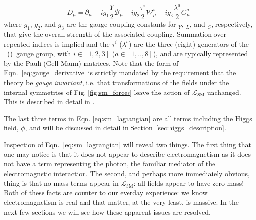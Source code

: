 \begin{equation}
	\mathit{D}_{\mu} = \partial_{\mu} - i g_1 \frac{Y}{2} \mathcal{B}_{\mu} - i g_2 \frac{\tau^i}{2} \mathcal{W}_{\mu}^i - i g_3 \frac{\lambda^a}{2} G_{\mu}^a
	\label{eq:gauge_derivative}
\end{equation}
where $g_1$, $g_2$, and $g_3$ are the gauge coupling constants for \Uone$_{Y}$, \SUtwo$_{L}$, and \SUthree$_{C}$, respectively, that give the overall strength of the associated coupling.
Summation over repeated indices is implied and the $\tau^i$ ($\lambda^a$) are the three (eight)
generators of the \SUtwo~(\SUthree)~gauge group, with $i \in [1,2,3]$ ($a \in [1,..,8]$), and
are typically represented by the Pauli (Gell-Mann) matrices. Note that the form of Eqn.~\ref{eq:gauge_derivative} is strictly mandated by the requirement that the theory
be \textit{gauge invariant}, i.e. that transformations of the fields under the internal symmetries
of Fig. \ref{fig:sm_forces} leave the action of $\mathcal{L}_{\text{SM}}$ unchanged. This is described in detail
in {\color{red}{Appendix XXX}}.

The last three terms in Eqn. \ref{eq:sm_lagrangian} are all terms including the Higgs field, $\phi$,
and will be discussed in detail in Section~\ref{sec:higgs_description}.

Inspection of Eqn.~\ref{eq:sm_lagrangian} will reveal two things. The first thing that one
may notice is that it does not appear to describe electromagnetism as it does not have a
term representing the photon, the familiar mediator of the electromagnetic interaction.
The second, and perhaps more immediately obvious, thing is that no mass terms
appear in $\mathcal{L}_{\text{SM}}$: all fields appear to have zero mass! Both of these
facts are counter to our everday experience: we know electromagnetism is real and that matter,
at the very least, is massive. In the next few sections we will see how these apparent
issues are resolved.


\floatbarrier



